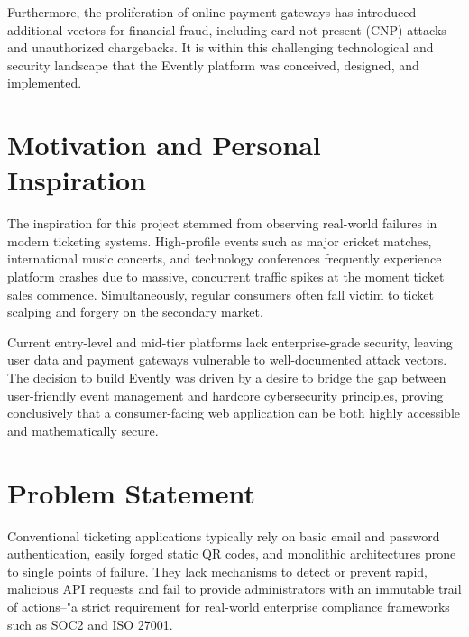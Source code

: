 \documentclass[12pt,a4paper]{report}
\begin{document}
Furthermore, the proliferation of online payment gateways has introduced additional vectors for financial fraud, including card-not-present (CNP) attacks and unauthorized chargebacks. It is within this challenging technological and security landscape that the Evently platform was conceived, designed, and implemented.

\section{Motivation and Personal Inspiration}
The inspiration for this project stemmed from observing real-world failures in modern ticketing systems. High-profile events such as major cricket matches, international music concerts, and technology conferences frequently experience platform crashes due to massive, concurrent traffic spikes at the moment ticket sales commence. Simultaneously, regular consumers often fall victim to ticket scalping and forgery on the secondary market.

Current entry-level and mid-tier platforms lack enterprise-grade security, leaving user data and payment gateways vulnerable to well-documented attack vectors. The decision to build Evently was driven by a desire to bridge the gap between user-friendly event management and hardcore cybersecurity principles, proving conclusively that a consumer-facing web application can be both highly accessible and mathematically secure.

\section{Problem Statement}
Conventional ticketing applications typically rely on basic email and password authentication, easily forged static QR codes, and monolithic architectures prone to single points of failure. They lack mechanisms to detect or prevent rapid, malicious API requests and fail to provide administrators with an immutable trail of actions--"a strict requirement for real-world enterprise compliance frameworks such as SOC2 and ISO 27001.
\end{document}
